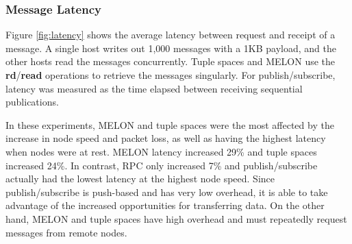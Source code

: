 \documentclass[lnicst]{svmultln}
\begin{document}


\subsubsection{Message Latency}

Figure \ref{fig:latency} shows the average latency between request and receipt of a message. A single host writes out 1,000 messages with a 1KB payload, and the other hosts read the messages concurrently. Tuple spaces and MELON use the \textbf{rd}/\textbf{read} operations to retrieve the messages singularly. For publish/subscribe, latency was measured as the time elapsed between receiving sequential publications.

In these experiments, MELON and tuple spaces were the most affected by the increase in node speed and packet loss, as well as having the highest latency when nodes were at rest. MELON latency increased 29\% and tuple spaces increased 24\%. In contrast, RPC only increased 7\% and publish/subscribe actually had the lowest latency at the highest node speed. Since publish/subscribe is push-based and has very low overhead, it is able to take advantage of the increased opportunities for transferring data. On the other hand, MELON and tuple spaces have high overhead and must repeatedly request messages from remote nodes.
\end{document}
